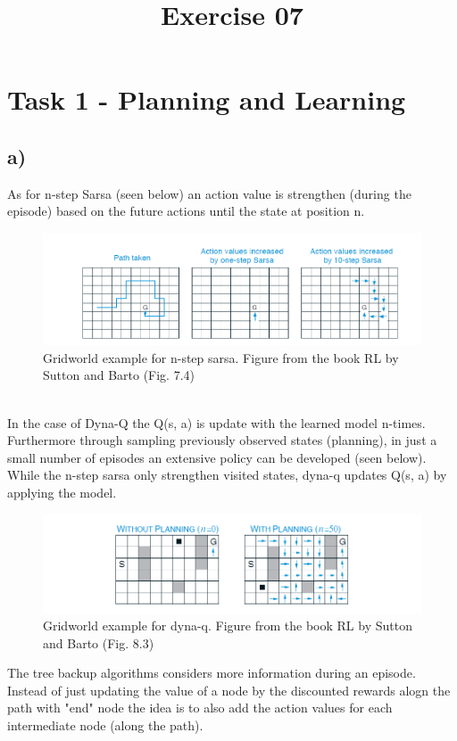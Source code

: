 \documentclass[a4paper]{article}
\date{}
\author{}
\title{\textbf{Exercise 07}}
\begin{document}
	\maketitle 
	\thispagestyle{fancy}
	
    \section*{Task 1 - Planning and Learning}
    	\subsection*{a)}    
    		As for n-step Sarsa (seen below) an action value is strengthen (during the episode) based on the future actions until the state at position n.	
\begin{figure}[!ht]
	\centering
	\includegraphics[width=0.8\linewidth]{n-step_sarsa} 
	\caption{Gridworld example for n-step sarsa. Figure from the book RL by Sutton and Barto (Fig. 7.4)}
	\label{fig:n-step_sarsa}
\end{figure}
\\
In the case of Dyna-Q the Q(s, a) is update with the learned model n-times. Furthermore through sampling previously observed states (planning), in just a small number of episodes an extensive policy can be developed (seen below). While the n-step sarsa only strengthen visited states, dyna-q updates Q(s, a) by applying the model.
\begin{figure}[!h]
	\centering
	\includegraphics[width=0.8\linewidth]{dyna-q} 
	\caption{Gridworld example for dyna-q. Figure from the book RL by Sutton and Barto (Fig. 8.3)}
	\label{fig:n-step_sarsa}
\end{figure}
\newpage 
The tree backup algorithms considers more information during an episode. Instead of just updating the value of a node by the discounted rewards alogn the path with "end" node the idea is to also add the action values for each intermediate node (along the path).
\end{document}

